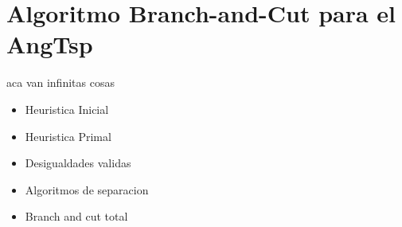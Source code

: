 \section*{Algoritmo Branch-and-Cut para el AngTsp}

aca van infinitas cosas

\begin{itemize}
\item Heuristica Inicial
\item Heuristica Primal
\item Desigualdades validas
\item Algoritmos de separacion
\item Branch and cut total
\end{itemize}
